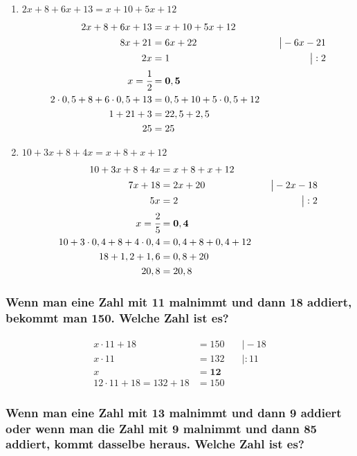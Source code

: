 \documentclass[a4paper,10pt]{article} %
\begin{document}
\begin{enumerate}[label=\alph*)]
  \item \(2x + 8 + 6x + 13 = x + 10 + 5x + 12\)
  \[
  \begin{aligned}
    2x + 8 + 6x + 13 &= x + 10 + 5x + 12 \\
    8x + 21 &= 6x + 22 &\quad\big| -6x - 21 \\
    2x &= 1 &\quad\big| : 2 \\
    x = \cfrac{1}{2} &= \mathbf{0,5} \\
    2 \cdot 0,5 + 8 + 6 \cdot 0,5 + 13 &= 0,5 + 10 + 5 \cdot 0,5 + 12 \\
    1 + 21 + 3 &= 22,5 + 2,5 \\
    25 &= 25
  \end{aligned}
  \]

  \item \(10 + 3x + 8 + 4x = x + 8 + x + 12\)
  \[
  \begin{aligned}
    10 + 3x + 8 + 4x &= x + 8 + x + 12 \\
    7x + 18 &= 2x + 20 &\quad\big| -2x - 18 \\
    5x &= 2 &\quad\big| : 2 \\
    x = \cfrac{2}{5} &= \mathbf{0,4} \\
    10 + 3 \cdot 0,4 + 8 + 4 \cdot 0,4 &= 0,4 + 8 + 0,4 + 12 \\
    18 + 1,2 + 1,6 &= 0,8 + 20 \\
    20,8 &= 20,8
  \end{aligned}
  \]

\end{enumerate}

\subsubsection{Wenn man eine Zahl mit 11 malnimmt und dann 18 addiert, bekommt man 150. %
  Welche Zahl ist es?}

  \[
    \begin{aligned}
      x \cdot 11 + 18 &= 150 &\quad\big| - 18 \\
      x \cdot 11 &= 132 &\quad\big| : 11 \\
      x &= \mathbf{12} \\
      12 \cdot 11 + 18 = 132 + 18 &= 150
    \end{aligned}
  \]

\subsubsection{Wenn man eine Zahl mit 13 malnimmt und dann 9 addiert oder wenn man die Zahl mit 9 malnimmt und dann 85 addiert,
  kommt dasselbe heraus. Welche Zahl ist es?} %
\end{document}
